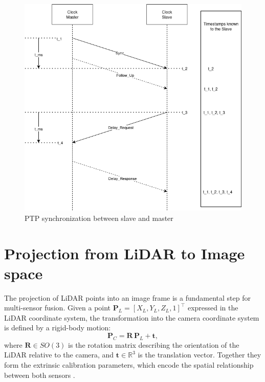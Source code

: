 \documentclass[english, bachelor, utf8]{base/thesis_telematics}
\begin{document}
\begin{figure}[h!]
    \centering
    \includegraphics[width=\textwidth]{pics/PTP.png}
    \caption{PTP synchronization between slave and master\cite{wikipediaPTP}}
    \label{fig:Master_Slave}
\end{figure}


\section{Projection from LiDAR to Image space}
\label{sec:proj_lidar_image}
The projection of LiDAR points into an image frame is a fundamental step for multi-sensor fusion. 
Given a point $\mathbf{P}_L = [X_L, Y_L, Z_L, 1]^\top$ expressed in the LiDAR coordinate system, 
the transformation into the camera coordinate system is defined by a rigid-body motion:
\[
  \mathbf{P}_C = \mathbf{R}\,\mathbf{P}_L + \mathbf{t},
\]
where $\mathbf{R} \in SO(3)$ is the rotation matrix describing the orientation of the LiDAR relative 
to the camera, and $\mathbf{t} \in \mathbb{R}^3$ is the translation vector. Together they form the 
extrinsic calibration parameters, which encode the spatial relationship between both sensors 
\cite{mishra2020extrinsic}.
\end{document}

